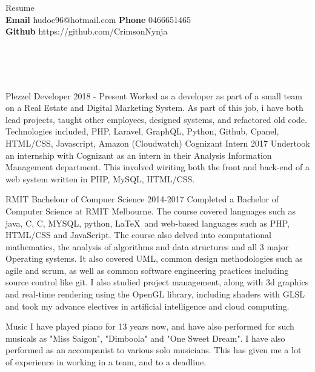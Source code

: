 \documentclass[9pt]{developercv}
\newcommand{\CC}{C\nolinebreak\hspace{-.05em}\raisebox{.4ex}{\tiny\bf +}\nolinebreak\hspace{-.10em}\raisebox{.4ex}{\tiny\bf +}}
\def\CC{{C\nolinebreak[4]\hspace{-.05em}\raisebox{.4ex}{\tiny\bf ++}}}
\begin{document}
	\begin{minipage}[a]{1.0\textwidth}
		\begin{center}
			{\HUGE Resume}\\ 
			\textbf {Email} hudoc96@hotmail.com
			\textbf {Phone} 0466651465 \\
			\textbf {Github} https://github.com/CrimsonNynja \\
		\end{center}
	\end{minipage}
	\\
	\\
	\\
	\begin{minipage}[t]{0.6\textwidth}
		\begin{entrylist}
			\entry
				{Plezzel}
				{Developer}
				{2018 - Present}
				{Worked as a developer as part of a small team on a Real Estate and Digital Marketing System. As part of this job, i have both lead projects, taught other employees, designed systems, and refactored old code. Technologies included, PHP, Laravel, GraphQL, Python, Github, Cpanel, HTML/CSS, Javascript, Amazon (Cloudwatch)}
			\entry
				{Cognizant}
				{Intern}
				{2017}
				{Undertook an internship with Cognizant as an intern in their Analysis Information Management department. This involved wiriting both the front and back-end of a web system written in PHP, MySQL, HTML/CSS.}
		\end{entrylist}	
		\cvsect{Education}
		\begin{entrylist}
			\entry
				{RMIT}
				{Bachelour of Compuer Science}
				{2014-2017}
				{Completed a Bachelor of Computer Science at RMIT Melbourne. The course covered languages such as java, C, \CC, MYSQL, python, \LaTeX  \  and web-based languages such as PHP, HTML/CSS and JavaScript. The course also delved into computational mathematics, the analysis of algorithms and data structures and all 3 major Operating systems. It also covered UML, common design methodologies such as agile and scrum, as well as common software engineering practices including source control like git. I also studied project management, along with 3d graphics and real-time rendering using the OpenGL library, including shaders with GLSL and took my advance electives in artificial intelligence and cloud computing.}
		\end{entrylist}
		\cvsect{Hobbies}
		\begin{entrylist}
			\entry
				{\vphantom{1.0}}
				{Music}
				{}
				{I have played piano for 13 years now, and have also performed for such musicals as "Miss Saigon", "Dimboola" and "One Sweet Dream". I have also performed as an accompanist to various solo musicians. This has given me a lot of experience in working in a team, and to a deadline.}

\end{entrylist}
\end{minipage}
\end{document}
